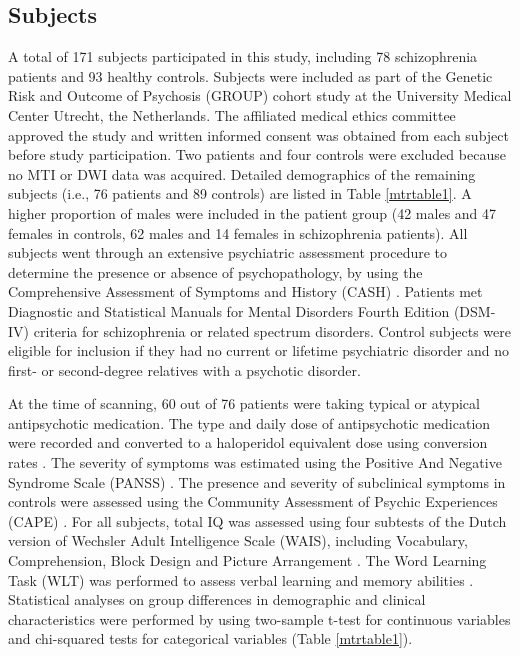 \begin{refsection}
\subsection*{Subjects}
A total of 171 subjects participated in this study, including 78 schizophrenia patients and 93 healthy controls. Subjects were included as part of the Genetic Risk and Outcome of Psychosis (GROUP) cohort study at the University Medical Center Utrecht, the Netherlands. The affiliated medical ethics committee approved the study and written informed consent was obtained from each subject before study participation. Two patients and four controls were excluded because no MTI or DWI data was acquired. Detailed demographics of the remaining subjects (i.e., 76 patients and 89 controls) are listed in Table \ref{mtrtable1}. A higher proportion of males were included in the patient group (42 males and 47 females in controls, 62 males and 14 females in schizophrenia patients). All subjects went through an extensive psychiatric assessment procedure to determine the presence or absence of psychopathology, by using the Comprehensive Assessment of Symptoms and History (CASH) \citep{Andreasen1992TheCA}. Patients met Diagnostic and Statistical Manuals for Mental Disorders Fourth Edition (DSM-IV) \citep{american2013diagnostic} criteria for schizophrenia or related spectrum disorders. Control subjects were eligible for inclusion if they had no current or lifetime psychiatric disorder and no first- or second-degree relatives with a psychotic disorder.

At the time of scanning, 60 out of 76 patients were taking typical or atypical antipsychotic medication. The type and daily dose of antipsychotic medication were recorded and converted to a haloperidol equivalent dose using conversion rates \citep{Kroken2009TreatmentOS}. The severity of symptoms was estimated using the Positive And Negative Syndrome Scale (PANSS) \citep{Kay1987ThePA}. The presence and severity of subclinical symptoms in controls were assessed using the Community Assessment of Psychic Experiences (CAPE) \citep{Stefanis2002EvidenceTT}. For all subjects, total IQ was assessed using four subtests of the Dutch version of Wechsler Adult Intelligence Scale (WAIS), including Vocabulary, Comprehension, Block Design and Picture Arrangement \citep{WAIS}. The Word Learning Task (WLT) was performed to assess verbal learning and memory abilities \citep{Brand1985LearningAR}. Statistical analyses on group differences in demographic and clinical characteristics were performed by using two-sample t-test for continuous variables and chi-squared tests for categorical variables (Table \ref{mtrtable1}).


\end{refsection}
